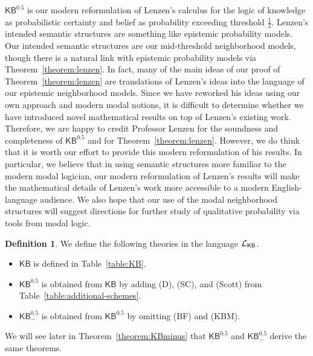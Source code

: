 \documentclass[12pt]{article}
\theoremstyle{definition}
\newtheorem{definition}[theorem]{Definition}
\newcommand{\Lang}{{\cal L}}   %
\newcommand{\KB}{{\mathsf{KB}}}                        %
\newcommand{\KBeq}{{\mathsf{KB}^{\mathsf{0.5}}}}       %
\newcommand{\KBeqm}{{\mathsf{KB}^{\mathsf{0.5}}_{-}}}  %
\begin{document}
$\KBeq$ is our modern reformulation of Lenzen's \cite{Lenzen1980:gwuw}
calculus for the logic of knowledge as probabilistic certainty and
belief as probability exceeding threshold $\frac 12$.  Lenzen's
intended semantic structures are something like epistemic probability
models.  Our intended semantic structures are our mid-threshold
neighborhood models, though there is a natural link with epistemic
probability models via Theorem~\ref{theorem:lenzen}.  In fact,
many of the main ideas of our proof of
Theorem~\ref{theorem:lenzen} are translations of Lenzen's ideas
into the language of our epistemic neighborhood models. Since we have
reworked his ideas using our own approach and modern modal notions, it
is difficult to determine whether we have introduced novel
mathematical results on top of Lenzen's existing work.  Therefore, we
are happy to credit Professor Lenzen for the soundness and
completeness of $\KBeq$ and for Theorem~\ref{theorem:lenzen}.
However, we do think that it is worth our effort to provide this
modern reformulation of his results.  In particular, we believe that
in using semantic structures more familiar to the modern modal
logician, our modern reformulation of Lenzen's results will make the
mathematical details of Lenzen's work more accessible to a modern
English-language audience.  We also hope that our use of the modal
neighborhood structures will suggest directions for further study of
qualitative probability via tools from modal logic.

\begin{definition}
  \label{definition:calculi}
  We define the following theories in the language $\Lang_\KB$.
  \begin{itemize}
  \item $\KB$ is defined in Table~\ref{table:KB}.

  \item $\KBeq$ is obtained from $\KB$ by adding (D), (SC), and (Scott)
    from Table~\ref{table:additional-schemes}.

  \item $\KBeqm$ is obtained from $\KBeq$ by omitting (BF) and (KBM).
  \end{itemize}
\end{definition}

We will see later in Theorem~\ref{theorem:KBminus} that $\KBeq$ and
$\KBeqm$ derive the same theorems.
\end{document}
